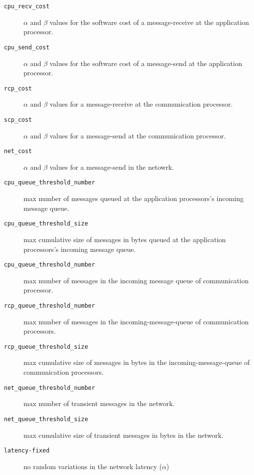 \begin{description}
\item[{\tt cpu\_recv\_cost}] $\alpha$ and  $\beta$ values  for the software
                            cost of a message-receive at the application
                            processor.
\item[{\tt cpu\_send\_cost}] $\alpha$ and  $\beta$ values  for the software
                            cost of a message-send at the application
                            processor.
\item[{\tt rcp\_cost}] $\alpha$ and  $\beta$ values for a message-receive 
                       at the communication processor.
\item[{\tt scp\_cost}] $\alpha$ and  $\beta$ values for a message-send
                       at the communication processor.
\item[{\tt net\_cost}] $\alpha$ and  $\beta$ values for a message-send
                       in the netowrk.
\item[{\tt cpu\_queue\_threshold\_number}] max number of messages queued
                       at the application processors's incoming message queue.
\item[{\tt cpu\_queue\_threshold\_size}] max cumulative size of messages in bytes
                       queued at the application processors's incoming message 
                       queue.


\item[{\tt cpu\_queue\_threshold\_number}] max number of messages in the incoming
                       message queue of communication processor.   


\item[{\tt rcp\_queue\_threshold\_number}] max number of messages in the 
                       incoming-message-queue of communication processors.                    
\item[{\tt rcp\_queue\_threshold\_size}] max cumulative size of messages in bytes
                       in the incoming-message-queue of communication 
                       processors.

\item[{\tt net\_queue\_threshold\_number}] max number of transient messages in 
                       the network.

\item[{\tt net\_queue\_threshold\_size}] max cumulative size of transient 
                       messages in bytes in the network.

\item[{\tt latency-fixed}] no random variations in the network latency 
                           ($\alpha$)


\end{description}
